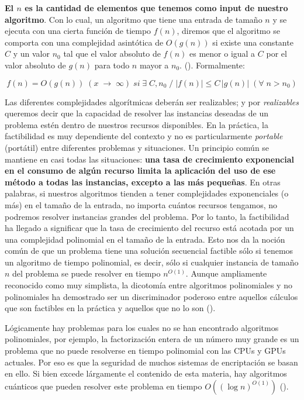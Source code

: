 \textbf{El $n$ es la cantidad de elementos que tenemos como input de nuestro algoritmo}. Con lo cual, un algoritmo que
tiene una entrada de tamaño $n$ y se ejecuta con una cierta función de tiempo $f(n)$, diremos que el algoritmo se
comporta con una complejidad asintótica de $O(g(n))$ si existe una constante $C$ y un valor $n_0$ tal que el valor
absoluto de $f(n)$ es menor o igual a $C$ por el valor absoluto de $g(n)$ para todo $n$ mayor a $n_0$.
(\textcite{wilf2002}). Formalmente:

\[
  f(n) = O(g(n)) \; (x \; \rightarrow \; \infty) \; si \; \exists \; C, n_0 \; \slash \; \lvert f(n) \rvert \leq C \,
  \lvert g(n) \rvert \; (\forall \; n > n_0)
\]

Las diferentes complejidades algorítmicas deberán ser realizables; y por \textit{realizables} queremos decir que la
capacidad de resolver las instancias deseadas de un problema estén dentro de nuestros recursos disponibles. En la
práctica, la factibilidad es muy dependiente del contexto y no es particularmente \textit{portable} (portátil) entre
diferentes problemas y situaciones. Un principio común se mantiene en casi todas las situaciones: \textbf{una tasa de
crecimiento exponencial en el consumo de algún recurso limita la aplicación del uso de ese método a todas las
instancias, excepto a las más pequeñas}. En otras palabras, si nuestros algoritmos tienden a tener complejidades
exponenciales (o más) en el tamaño de la entrada, no importa cuántos recursos tengamos, no podremos resolver instancias
grandes del problema. Por lo tanto, la factibilidad ha llegado a significar que la tasa de crecimiento del recurso está
acotada por un una complejidad polinomial en el tamaño de la entrada. Esto nos da la noción común de que un problema
tiene una solución secuencial factible sólo si tenemos un algoritmo de tiempo polinomial, es decir, sólo si cualquier
instancia de tamaño $n$ del problema se puede resolver en tiempo $n^{O(1)}$. Aunque ampliamente reconocido como muy
simplista, la dicotomía entre algoritmos polinomiales y no polinomiales ha demostrado ser un discriminador poderoso
entre aquellos cálculos que son factibles en la práctica y aquellos que no lo son (\textcite{greenlaw1995}).

Lógicamente hay problemas para los cuales no se han encontrado algoritmos polinomiales, por ejemplo, la factorización
entera de un número muy grande es un problema que no puede resolverse en tiempo polinomial con las CPUs y GPUs actuales.
Por eso es que la seguridad de muchos sistemas de encriptación se basan en ello. Si bien excede lárgamente el contenido
de esta materia, hay algoritmos cuánticos que pueden resolver este problema en tiempo $O((\log n)^{O(1)})$
(\cite{ekert1996}).

